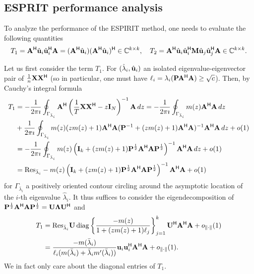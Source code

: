 \documentclass[11pt,a4paper]{article}
\begin{document}
\subsection{ESPRIT performance analysis}


To analyze the performance of the ESPIRIT method, one needs to evaluate the following quantities
\begin{equation}
	T_1 = {\mathbf{A}}^{\sf H} \hat {\mathbf{u}}_i \hat {\mathbf{u}}_i^{\sf H} {\mathbf{A}} = ({\mathbf{A}}^{\sf H} \hat {\mathbf{u}}_i) ({\mathbf{A}}^{\sf H} \hat {\mathbf{u}}_i)^{\sf H} \in {\mathbb{C}}^{k \times k}, \quad T_2 = {\mathbf{A}}^{\sf H} \hat {\mathbf{u}}_i \hat {\mathbf{u}}_i^{\sf H} {\mathbf{M}} \hat {\mathbf{u}}_j \hat {\mathbf{u}}_j^{\sf H} {\mathbf{A}} \in {\mathbb{C}}^{k \times k}.
\end{equation}

Let us first consider the term $T_1$. For $(\hat \lambda_i, \hat {\mathbf{u}}_i)$ an isolated eigenvalue-eigenvector pair of $\frac1n {\mathbf{X}} {\mathbf{X}}^{\sf H}$ (so in particular, one must have $\ell_i = \lambda_i(\mathbf{P} {\mathbf{A}}^{\sf H} {\mathbf{A}}) \geq \sqrt c$). Then, by Cauchy's integral formula
\begin{align}
	T_1 &= -\frac1{2\pi \imath} \oint_{\Gamma_{\bar \lambda_i}} {\mathbf{A}}^{\sf H} \left(\frac1T {\mathbf{X}} {\mathbf{X}}^{\sf H} - z \mathbf{I}_N \right)^{-1} {\mathbf{A}} \,dz = -\frac1{2\pi \imath}  \oint_{\Gamma_{\bar \lambda_i}} m(z) {\mathbf{A}}^{\sf H} {\mathbf{A}} \,dz \\ 
	 &+\frac1{2\pi \imath}  \oint_{\Gamma_{\bar \lambda_i}} m(z) (z m(z) + 1) {\mathbf{A}}^{\sf H} {\mathbf{A}} (\mathbf{P}^{-1} + (z m(z) + 1) {\mathbf{A}}^{\sf H} {\mathbf{A}}  )^{-1} {\mathbf{A}}^{\sf H} {\mathbf{A}} \,dz + o(1) \\ 
	 &= -\frac1{2\pi \imath}  \oint_{\Gamma_{\bar \lambda_i}} m(z) \left( \mathbf{I}_k + (z m(z) +1) \mathbf{P}^{\frac12} {\mathbf{A}}^{\sf H} {\mathbf{A}} \mathbf{P}^{\frac12} \right)^{-1}{\mathbf{A}}^{\sf H} {\mathbf{A}} \,dz + o(1) \\ 
	 &= {\rm Res}_{\bar \lambda_i} -m(z) \left( \mathbf{I}_k + (z m(z) +1) \mathbf{P}^{\frac12} {\mathbf{A}}^{\sf H} {\mathbf{A}} \mathbf{P}^{\frac12} \right)^{-1}{\mathbf{A}}^{\sf H} {\mathbf{A}} + o(1)
\end{align}
for $\Gamma_{\bar \lambda_i}$ a positively oriented contour circling around the asymptotic location of the $i$-th eigenvalue $\hat \lambda_i$. It thus suffices to consider the eigendecomposition of $\mathbf{P}^{\frac12} {\mathbf{A}}^{\sf H} {\mathbf{A}} \mathbf{P}^{\frac12} = {\mathbf{U}} \boldsymbol{\Lambda} {\mathbf{U}}^{\sf H}$ and
\begin{align*}
		T_1 &= {\rm Res}_{\bar \lambda_i} {\mathbf{U}} \operatorname{diag} \left\{ \frac{-m(z)}{ 1 + ( z m(z) + 1) \ell_j } \right\}_{j=1}^k {\mathbf{U}}^{\sf H} {\mathbf{A}}^{\sf H} {\mathbf{A}} + o_{\| \cdot \|}(1) \\ 
		&= \frac{-m(\bar \lambda_i)}{ \ell_i ( m(\bar \lambda_i) + \bar \lambda_i m'(\bar \lambda_i) )} \mathbf{u}_i \mathbf{u}_i^{\sf H} {\mathbf{A}}^{\sf H} {\mathbf{A}} + o_{\| \cdot \|}(1).
\end{align*}
We in fact only care about the diagonal entries of $T_1$.
\end{document}
